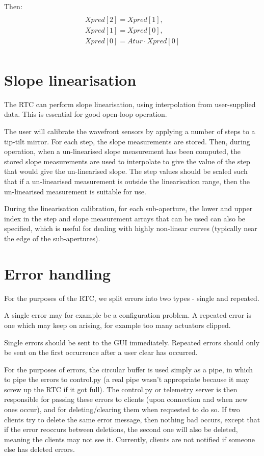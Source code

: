 \documentclass[a4,10pt]{article}
\begin{document}
Then: 
\begin{multline}\\
Xpred[2]=Xpred[1],\\
Xpred[1]=Xpred[0],\\
Xpred[0]=Atur \cdot Xpred[0]\\
\end{multline}

\section{Slope linearisation}
\label{sect:linearisation}
The RTC can perform slope linearisation, using interpolation from
user-supplied data.  This is essential for good open-loop operation.

The user will calibrate the wavefront sensors by applying a number of
steps to a tip-tilt mirror.  For each step, the slope measurements are
stored.  Then, during operation, when a un-linearised slope
measurement has been computed, the stored slope measurements are used
to interpolate to give the value of the step that would give the
un-linearised slope.  The step values should be scaled such that if a
un-linearised measurement is outside the linearisation range, then the
un-linearised measurement is suitable for use.

During the linearisation calibration, for each sub-aperture, the lower
and upper index in the step and slope measurement arrays that can be
used can also be specified, which is useful for dealing with highly
non-linear curves (typically near the edge of the sub-apertures).  


\section{Error handling}
For the purposes of the RTC, we split errors into two types - single
and repeated.  

A single error may for example be a configuration problem.  A repeated
error is one which may keep on arising, for example too many actuators
clipped.  

Single errors should be sent to the GUI immediately.  Repeated errors
should only be sent on the first occurrence after a user clear has
occurred.  

For the purposes of errors, the circular buffer is used simply as a
pipe, in which to pipe the errors to control.py (a real pipe wasn't
appropriate because it may screw up the RTC if it got full).  The
control.py or telemetry server is then responsible for passing these
errors to clients (upon connection and when new ones occur), and for
deleting/clearing them when requested to do so.  If two clients try to
delete the same error message, then nothing bad occurs, except that if
the error reoccurs between deletions, the second one will also be
deleted, meaning the clients may not see it.  Currently, clients are
not notified if someone else has deleted errors.
\end{document}
